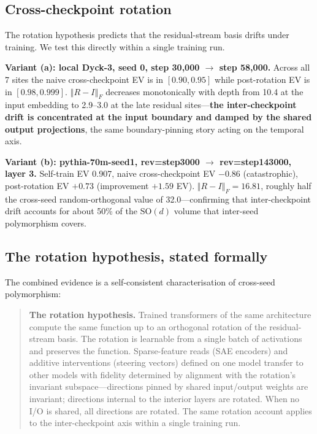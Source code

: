 \documentclass[11pt,letterpaper]{article}
\newcommand{\R}{R}
\newcommand{\frobnorm}[1]{\left\Vert #1 \right\Vert_F}
\begin{document}
\subsection{Cross-checkpoint rotation}

The rotation hypothesis predicts that the residual-stream basis drifts under training. We test this directly within a single training run.

\textbf{Variant (a): local Dyck-3, seed 0, step 30{,}000 $\to$ step 58{,}000.} Across all 7 sites the naive cross-checkpoint EV is in $[0.90, 0.95]$ while post-rotation EV is in $[0.98, 0.999]$. $\frobnorm{\R - I}$ decreases monotonically with depth from 10.4 at the input embedding to 2.9--3.0 at the late residual sites---\textbf{the inter-checkpoint drift is concentrated at the input boundary and damped by the shared output projections}, the same boundary-pinning story acting on the temporal axis.

\textbf{Variant (b): pythia-70m-seed1, rev=step3000 $\to$ rev=step143000, layer 3.} Self-train EV 0.907, naive cross-checkpoint EV $-0.86$ (catastrophic), post-rotation EV $+0.73$ (improvement $+1.59$ EV). $\frobnorm{\R - I} = 16.81$, roughly half the cross-seed random-orthogonal value of 32.0---confirming that inter-checkpoint drift accounts for about 50\% of the $\mathrm{SO}(d)$ volume that inter-seed polymorphism covers.

\subsection{The rotation hypothesis, stated formally}

The combined evidence is a self-consistent characterisation of cross-seed polymorphism:

\begin{quote}
\textbf{The rotation hypothesis.} Trained transformers of the same architecture compute the same function up to an orthogonal rotation of the residual-stream basis. The rotation is learnable from a single batch of activations and preserves the function. Sparse-feature reads (SAE encoders) and additive interventions (steering vectors) defined on one model transfer to other models with fidelity determined by alignment with the rotation's invariant subspace---directions pinned by shared input/output weights are invariant; directions internal to the interior layers are rotated. When no I/O is shared, all directions are rotated. The same rotation account applies to the inter-checkpoint axis within a single training run.
\end{quote}
\end{document}
